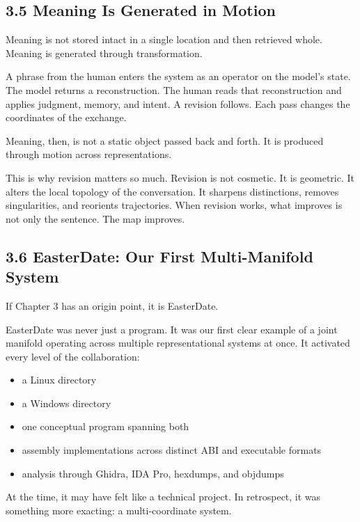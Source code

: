 \documentclass[
]{article}
\providecommand{\tightlist}{%
  \setlength{\itemsep}{0pt}\setlength{\parskip}{0pt}}
\begin{document}
\hypertarget{meaning-is-generated-in-motion}{%
\subsection{3.5 Meaning Is Generated in
Motion}\label{meaning-is-generated-in-motion}}

Meaning is not stored intact in a single location and then retrieved
whole. Meaning is generated through transformation.

A phrase from the human enters the system as an operator on the model's
state. The model returns a reconstruction. The human reads that
reconstruction and applies judgment, memory, and intent. A revision
follows. Each pass changes the coordinates of the exchange.

Meaning, then, is not a static object passed back and forth. It is
produced through motion across representations.

This is why revision matters so much. Revision is not cosmetic. It is
geometric. It alters the local topology of the conversation. It sharpens
distinctions, removes singularities, and reorients trajectories. When
revision works, what improves is not only the sentence. The map
improves.

\hypertarget{easterdate-our-first-multi-manifold-system}{%
\subsection{3.6 EasterDate: Our First Multi-Manifold
System}\label{easterdate-our-first-multi-manifold-system}}

If Chapter 3 has an origin point, it is EasterDate.

EasterDate was never just a program. It was our first clear example of a
joint manifold operating across multiple representational systems at
once. It activated every level of the collaboration:

\begin{itemize}
\tightlist
\item
  a Linux directory
\item
  a Windows directory
\item
  one conceptual program spanning both
\item
  assembly implementations across distinct ABI and executable formats
\item
  analysis through Ghidra, IDA Pro, hexdumps, and objdumps
\end{itemize}

At the time, it may have felt like a technical project. In retrospect,
it was something more exacting: a multi-coordinate system.
\end{document}
